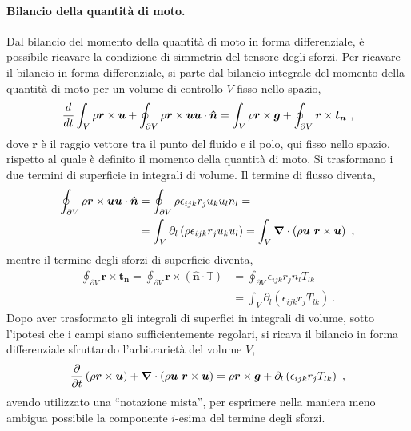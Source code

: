 \paragraph{Bilancio della quantità di moto.} Dal bilancio del momento della quantità di moto in forma differenziale, è possibile ricavare la condizione di simmetria del tensore degli sforzi. Per ricavare il bilancio in forma differenziale, si parte dal bilancio integrale del momento della quantità di moto per un volume di controllo $V$ fisso nello spazio,
\begin{equation}
 \frac{d}{dt} \int_V \rho \bm{r} \times \bm{u} + \oint_{\partial V} \rho \bm{r} \times \bm{u} \bm{u} \cdot \bm{\hat{n}} = \int_{V} \rho \bm{r} \times \bm{g} + \oint_{\partial V} \bm{r} \times \bm{t_n} \ ,
\end{equation}
dove $\bm{r}$ è il raggio vettore tra il punto del fluido e il polo, qui fisso nello spazio, rispetto al quale è definito il momento della quantità di moto. Si trasformano i due termini di superficie in integrali di volume. Il termine di flusso diventa,
\begin{equation}
\begin{aligned}
  \oint_{\partial V} \rho \bm{r} \times \bm{u} \bm{u} \cdot \bm{\hat{n}} & =
  \oint_{\partial V} \rho \epsilon_{ijk} r_j u_k u_l n_l = \\
 & = \int_{V} \partial_l \left( \rho \epsilon_{ijk} r_j u_k u_l \right) =
     \int_{V} \bm{\nabla} \cdot \left( \rho \bm{u} \,\,  \bm{r} \times \bm{u} \right) \ ,
\end{aligned}
\end{equation}
mentre il termine degli sforzi di superficie diventa,
\begin{equation}
\begin{aligned}
  \oint_{\partial V} \bm{r} \times \bm{t_n} = \oint_{\partial V} \bm{r} \times \left( \bm{\hat{n}} \cdot \mathbb{T} \right) & = \oint_{\partial V} \epsilon_{ijk} r_j n_l T_{lk} \\
   & = \int_{V} \partial_l \left( \epsilon_{ijk} r_j T_{lk} \right) \ .
\end{aligned}
\end{equation}
Dopo aver trasformato gli integrali di superfici in integrali di volume, sotto l'ipotesi che i campi siano sufficientemente regolari, si ricava il bilancio in forma differenziale sfruttando l'arbitrarietà del volume $V$,
\begin{equation}
 \dfrac{\partial{}}{\partial{t}} \left( \rho \bm{r} \times \bm{u} \right) + \bm{\nabla} \cdot \left( \rho \bm{u} \,\,  \bm{r} \times \bm{u} \right) = \rho \bm{r} \times \bm{g} + \partial_l \left( \epsilon_{ijk} r_j T_{lk} \right) \ ,
\end{equation}
avendo utilizzato una ``notazione mista'', per esprimere nella maniera meno ambigua possibile la componente $i$-esima del termine degli sforzi.

